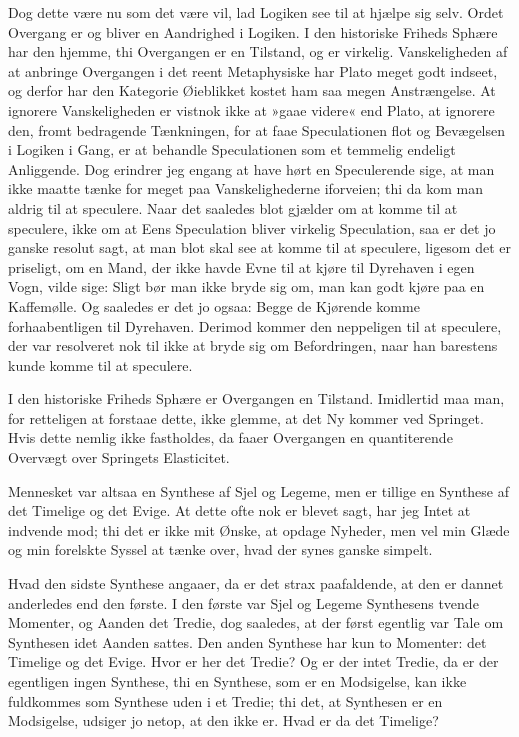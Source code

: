 \documentclass[12pt,a4paper]{article}
\begin{document}
Dog dette være nu som det være vil, lad Logiken see til at hjælpe sig selv. Ordet Overgang er og bliver en Aandrighed i Logiken. I den historiske Friheds Sphære har den hjemme, thi Overgangen er en Tilstand, og er virkelig. Vanskeligheden af at anbringe Overgangen i det reent Metaphysiske har Plato meget godt indseet, og derfor har den Kategorie Øieblikket kostet ham saa megen Anstrængelse. At ignorere Vanskeligheden er vistnok ikke at »gaae videre« end Plato, at ignorere den, fromt bedragende Tænkningen, for at faae Speculationen flot og Bevægelsen i Logiken i Gang, er at behandle Speculationen som et temmelig endeligt Anliggende. Dog erindrer jeg engang at have hørt en Speculerende sige, at man ikke maatte tænke for meget paa Vanskelighederne iforveien; thi da kom man aldrig til at speculere. Naar det saaledes blot gjælder om at komme til at speculere, ikke om at Eens Speculation bliver virkelig Speculation, saa er det jo ganske resolut sagt, at man blot skal see at komme til at speculere, ligesom det er priseligt, om en Mand, der ikke havde Evne til at kjøre til Dyrehaven i egen Vogn, vilde sige: Sligt bør man ikke bryde sig om, man kan godt kjøre paa en Kaffemølle. Og saaledes er det jo ogsaa: Begge de Kjørende komme forhaabentligen til Dyrehaven. Derimod kommer den neppeligen til at speculere, der var resolveret nok til ikke at bryde sig om Befordringen, naar han barestens kunde komme til at speculere.

I den historiske Friheds Sphære er Overgangen en Tilstand. Imidlertid maa man, for retteligen at forstaae dette, ikke glemme, at det Ny kommer ved Springet. Hvis dette nemlig ikke fastholdes, da faaer Overgangen en quantiterende Overvægt over Springets Elasticitet.

Mennesket var altsaa en Synthese af Sjel og Legeme, men er tillige en Synthese af det Timelige og det Evige. At dette ofte nok er blevet sagt, har jeg Intet at indvende mod; thi det er ikke mit Ønske, at opdage Nyheder, men vel min Glæde og min forelskte Syssel at tænke over, hvad der synes ganske simpelt.

Hvad den sidste Synthese angaaer, da er det strax paafaldende, at den er dannet anderledes end den første. I den første var Sjel og Legeme Synthesens tvende Momenter, og Aanden det Tredie, dog saaledes, at der først egentlig var Tale om Synthesen idet Aanden sattes. Den anden Synthese har kun to Momenter: det Timelige og det Evige. Hvor er her det Tredie? Og er der intet Tredie, da er der egentligen ingen Synthese, thi en Synthese, som er en Modsigelse, kan ikke fuldkommes som Synthese uden i et Tredie; thi det, at Synthesen er en Modsigelse, udsiger jo netop, at den ikke er. Hvad er da det Timelige?
\end{document}
